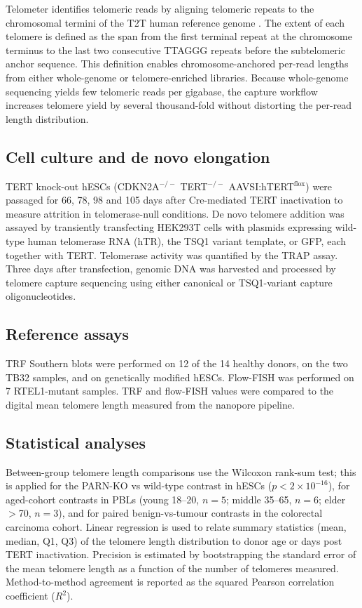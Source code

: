 \documentclass[11pt]{article}
\begin{document}
Telometer identifies telomeric reads by aligning telomeric repeats to
the chromosomal termini of the T2T human reference genome
\citep{nurk2022complete}. The extent of each telomere is defined as the
span from the first terminal repeat at the chromosome terminus to the
last two consecutive TTAGGG repeats before the subtelomeric anchor
sequence. This definition enables chromosome-anchored per-read lengths
from either whole-genome or telomere-enriched libraries. Because
whole-genome sequencing yields few telomeric reads per gigabase, the
capture workflow increases telomere yield by several thousand-fold
without distorting the per-read length distribution.

\subsection{Cell culture and de novo elongation}

TERT knock-out hESCs (CDKN2A$^{-/-}$ TERT$^{-/-}$ AAVSI:hTERT$^{\text{flox}}$)
were passaged for 66, 78, 98 and 105 days after Cre-mediated TERT
inactivation to measure attrition in telomerase-null conditions. De novo
telomere addition was assayed by transiently transfecting HEK293T cells
with plasmids expressing wild-type human telomerase RNA (hTR), the TSQ1
variant template, or GFP, each together with TERT. Telomerase activity
was quantified by the TRAP assay. Three days after transfection,
genomic DNA was harvested and processed by telomere capture sequencing
using either canonical or TSQ1-variant capture oligonucleotides.

\subsection{Reference assays}

TRF Southern blots were performed on 12 of the 14 healthy donors, on
the two TB32 samples, and on genetically modified hESCs. Flow-FISH
was performed on 7 RTEL1-mutant samples. TRF and flow-FISH values were
compared to the digital mean telomere length measured from the
nanopore pipeline.

\subsection{Statistical analyses}

Between-group telomere length comparisons use the Wilcoxon rank-sum
test; this is applied for the PARN-KO vs wild-type contrast in hESCs
($p < 2 \times 10^{-16}$), for aged-cohort contrasts in PBLs (young
18--20, $n{=}5$; middle 35--65, $n{=}6$; elder $>$70, $n{=}3$), and for
paired benign-vs-tumour contrasts in the colorectal carcinoma cohort.
Linear regression is used to relate summary statistics (mean, median,
Q1, Q3) of the telomere length distribution to donor age or days post
TERT inactivation. Precision is estimated by bootstrapping the standard
error of the mean telomere length as a function of the number of
telomeres measured. Method-to-method agreement is reported as the
squared Pearson correlation coefficient ($R^{2}$).
\end{document}
